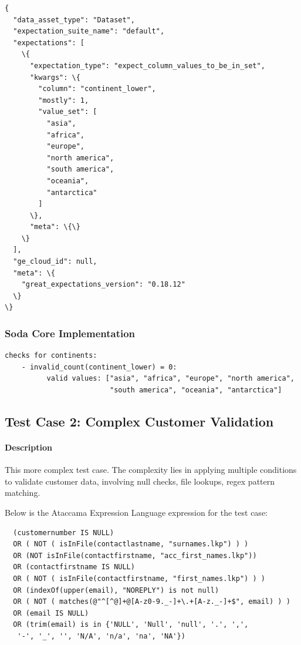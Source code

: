 \begin{verbatim}
{
  "data_asset_type": "Dataset",
  "expectation_suite_name": "default",
  "expectations": [
    \{
      "expectation_type": "expect_column_values_to_be_in_set",
      "kwargs": \{
        "column": "continent_lower",
        "mostly": 1,
        "value_set": [
          "asia",
          "africa",
          "europe",
          "north america",
          "south america",
          "oceania",
          "antarctica"
        ]
      \},
      "meta": \{\}
    \}
  ],
  "ge_cloud_id": null,
  "meta": \{
    "great_expectations_version": "0.18.12"
  \}
\}
\end{verbatim}

\subsubsection{Soda Core Implementation}

\begin{verbatim}
checks for continents:
    - invalid_count(continent_lower) = 0:
          valid values: ["asia", "africa", "europe", "north america", 
                         "south america", "oceania", "antarctica"]
\end{verbatim}


\subsection{Test Case 2: Complex Customer Validation}

\paragraph{Description} This more complex test case. The complexity lies in applying multiple conditions to validate customer data, involving null checks, file lookups, regex pattern matching.

Below is the Ataccama Expression Language expression for the test case:

\begin{verbatim}
  (customernumber IS NULL)
  OR ( NOT ( isInFile(contactlastname, "surnames.lkp") ) ) 
  OR (NOT isInFile(contactfirstname, "acc_first_names.lkp"))
  OR (contactfirstname IS NULL)
  OR ( NOT ( isInFile(contactfirstname, "first_names.lkp") ) )
  OR (indexOf(upper(email), "NOREPLY") is not null)
  OR ( NOT ( matches(@"^[^@]+@[A-z0-9._-]+\.+[A-z._-]+$", email) ) )
  OR (email IS NULL)
  OR (trim(email) is in {'NULL', 'Null', 'null', '.', ',',
   '-', '_', '', 'N/A', 'n/a', 'na', 'NA'})
\end{verbatim}

